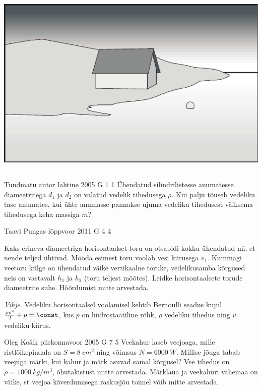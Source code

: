 \documentclass[11pt]{article}
\begin{document}
{{\begin{center}
	\includegraphics[width=0.9\linewidth]{2008-lahg-09-yl}
\end{center}
\fi
}
\newpage\subsection{\protect{}}

{Tundmatu autor} %
{lahtine} %
{2005} %
{G 1} %
{1} %
{
\ifStatement
Ühendatud silindrilistesse anumatesse diameetritega $d_1$ ja $d_2$ on valatud vedelik tihedusega $\rho$. Kui palju tõuseb vedeliku tase anumates, kui ühte anumasse pannakse ujuma vedeliku tihedusest väiksema tihedusega keha massiga $m$?
\fi
}

{Taavi Pungas} %
{lõppvoor} %
{2011} %
{G 4} %
{4} %
{
\ifStatement
Kaks erineva diameetriga horisontaalset toru on otsapidi
kokku ühendatud nii, et nende teljed ühtivad. Mööda esimest toru voolab vesi
kiirusega $v_1$. Kummagi veetoru külge on ühendatud väike vertikaalne toruke,
vedelikusamba kõrgused neis on vastavalt $h_1$ ja $h_2$ (toru teljest mõõtes). Leidke
horisontaalsete torude diameetrite suhe. Hõõrdumist mitte arvestada. 

\emph{Vihje}. 
Vedeliku horisontaalsel voolamisel kehtib Bernoulli seadus kujul $\frac{\rho v^2}{2}+p=\const$, kus $p$ on hüdrostaatiline rõhk, $\rho$ vedeliku tihedus ning $v$ vedeliku kiirus.
\fi
}

{Oleg Košik} %
{piirkonnavoor} %
{2005} %
{G 7} %
{5} %
{
\ifStatement
Veekahur laseb veejoaga, mille ristlõikepindala on $S = \SI{8}{cm^2}$ ning võimsus $N = \SI{6000}{W}$. Millise jõuga tabab veejuga märki, kui kahur ja märk asuvad samal kõrgusel? Vee tihedus on $\rho = \SI{1000}{kg/m^3}$, õhutakistust mitte arvestada. Märklaua ja veekahuri vahemaa on väike, st veejoa kõverdumisega raskusjõu toimel võib mitte arvestada.
\fi
}

}
\end{document}
